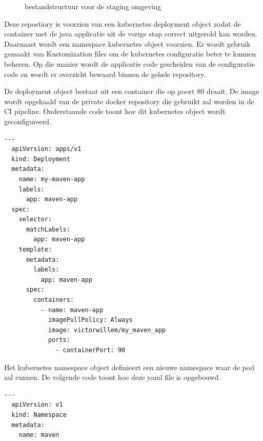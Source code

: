 \begin{figure}[H]
  \caption{\label{fig:bestandstructuur}bestandstructuur voor de staging omgeving}
\end{figure}
\vspace{4cm}
Deze repostiory is voorzien van een kubernetes deployment object zodat de container met de java applicatie uit de vorige stap correct uitgerold kan worden. Daarnaast wordt een namespace kubernetes object voorzien. Er wordt gebruik gemaakt van Kustomization files om de kubernetes configuratie beter te kunnen beheren. Op die manier wordt de applicatie code gescheiden van de configuratie code en wordt er overzicht bewaard binnen de gehele repository.
\newline

De deployment object bestaat uit een container die op poort 80 draait. De image wordt opgehaald van de private docker repository die gebruikt zal worden in de CI pipeline. Onderstaande code toont hoe dit kubernetes object wordt geconfigureerd. 
\newline

\begin{lstlisting}[style=kubernetesyaml,language=kubernetesyaml]
  ---
  apiVersion: apps/v1
  kind: Deployment
  metadata:
    name: my-maven-app
    labels:
      app: maven-app
  spec:
    selector:
      matchLabels:
        app: maven-app
    template:
      metadata:
        labels:
          app: maven-app
      spec:
        containers:
          - name: maven-app
            imagePullPolicy: Always
            image: victorwillem/my_maven_app
            ports:
              - containerPort: 90
\end{lstlisting}

\vspace{0.5cm}
Het kubernetes namespace object definieert een nieuwe namespace waar de pod zal runnen. De volgende code toont hoe deze yaml file is opgebouwd.
\newline

\begin{lstlisting}[style=kubernetesyaml,language=kubernetesyaml]
  ---
  apiVersion: v1
  kind: Namespace
  metadata:
    name: maven
\end{lstlisting}

\vspace{2cm}

